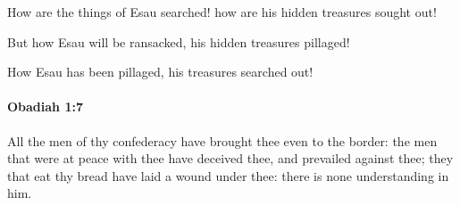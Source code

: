 			\begin{versebox}
					\item[BHS] 
					\item[LXX] 
					\item[ASV] How are the things of Esau searched! how are his hidden treasures sought out!
					\item[NIV] But how Esau will be ransacked, his hidden treasures pillaged!
					\item[NRSV] How Esau has been pillaged, his treasures searched out!
			\end{versebox}

		\paragraph{Obadiah 1:7} %
			\label{OBADIAH-1-7}

			All the men of thy confederacy have brought thee even to the border: the men that were at peace with thee have deceived thee, and prevailed against thee; they that eat thy bread have laid a wound under thee: there is none understanding in him.

